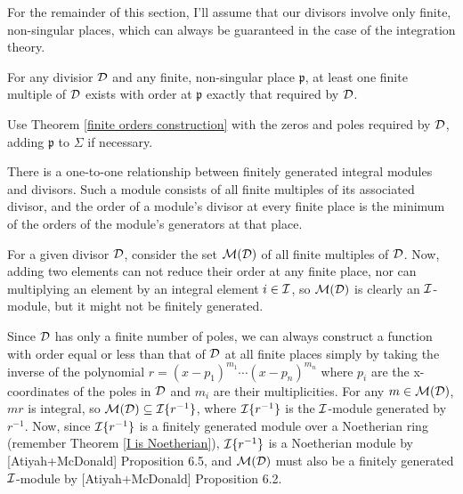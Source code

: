 \enddefinition

For the remainder of this section, I'll assume that our divisors
involve only finite, non-singular places, which can always be
guaranteed in the case of the integration theory.

\theorem
\label{exact order existance}

For any divisior ${\cal D}$ and any finite, non-singular place
$\mathfrak{p}$, at least one finite multiple of ${\cal D}$ exists with
order at $\mathfrak{p}$ exactly that required by ${\cal D}$.

\proof

Use Theorem \ref{finite orders construction} with the zeros and poles
required by ${\cal D}$, adding $\mathfrak{p}$
to $\Sigma$ if necessary.

\endtheorem

\theorem
\label{divisor-module isomorphism}

There is a one-to-one relationship between finitely generated integral
modules and divisors.  Such a module consists of all finite multiples
of its associated divisor, and the order of a module's divisor at
every finite place is the minimum of the orders of the module's
generators at that place.

\proof

For a given divisor ${\cal D}$, consider the set ${\cal M}({\cal D})$
of all finite multiples of ${\cal D}$.
Now, adding two
elements can not reduce their order at any finite place, nor can
multiplying an element by an integral element $i \in {\cal I}$, so
${\cal M}({\cal D})$ is clearly an ${\cal I}$-module, but it
might not be finitely generated.

Since ${\cal D}$ has only a finite number of poles, we can always
construct a function with order equal or less than that of ${\cal D}$
at all finite places simply by taking the inverse of the polynomial
$r=(x-p_1)^{m_1} \cdots (x-p_n)^{m_n}$ where $p_i$ are the x-coordinates
of the poles in ${\cal D}$ and $m_i$ are their multiplicities.
For any $m \in {\cal M}({\cal D})$, $mr$ is integral, so ${\cal M}({\cal D})
\subseteq {\cal I}\{r^{-1}\}$, where ${\cal I}\{r^{-1}\}$ is the ${\cal I}$-module
generated by $r^{-1}$.  Now, since ${\cal I}\{r^{-1}\}$ is a finitely
generated module over a Noetherian ring (remember Theorem \ref{I is
Noetherian}), ${\cal I}\{r^{-1}\}$ is a Noetherian module by
[Atiyah+McDonald] Proposition 6.5, and ${\cal M}({\cal D})$ must also
be a finitely generated ${\cal I}$-module by [Atiyah+McDonald]
Proposition 6.2.

